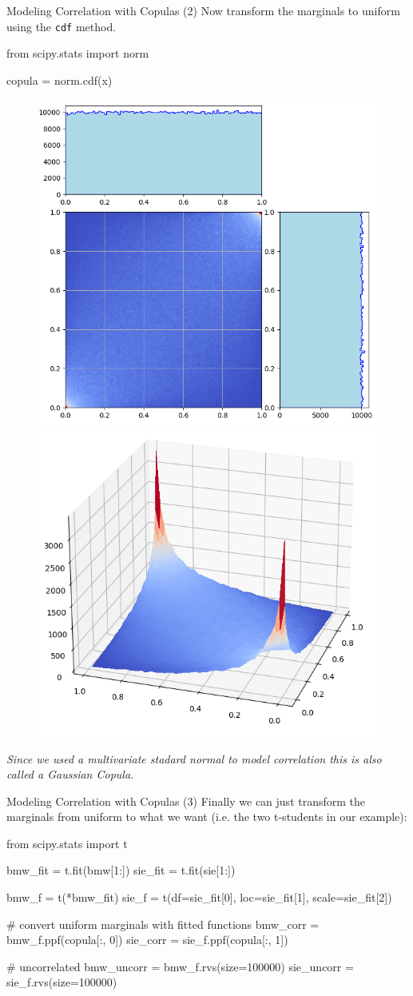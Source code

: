 \documentclass{beamer}
\begin{document}
\begin{frame}[fragile]{Modeling Correlation with Copulas (2)}
  Now transform the marginals to uniform using the \texttt{cdf} method. 
  \begin{ipython}
from scipy.stats import norm

copula = norm.cdf(x)    
\end{ipython}
  \begin{figure}[h]
    \begin{center}
      \includegraphics[width=0.4\linewidth]{copula_2d} \quad
      \includegraphics[width=0.4\linewidth]{copula_3d}
    \end{center}
  \end{figure}
  \emph{Since we used a multivariate stadard normal to model correlation this is also called a Gaussian Copula.}
\end{frame}

\begin{frame}[fragile]{Modeling Correlation with Copulas (3)}
 Finally we can just transform the marginals from uniform to what we want (i.e. the two t-students in our example):
\begin{ipython}
from scipy.stats import t

bmw_fit = t.fit(bmw[1:])
sie_fit = t.fit(sie[1:])

bmw_f = t(*bmw_fit)
sie_f = t(df=sie_fit[0], loc=sie_fit[1], scale=sie_fit[2])

# convert uniform marginals with fitted functions
bmw_corr = bmw_f.ppf(copula[:, 0])
sie_corr = sie_f.ppf(copula[:, 1])

# uncorrelated
bmw_uncorr = bmw_f.rvs(size=100000)
sie_uncorr = sie_f.rvs(size=100000)
\end{ipython}
\end{frame}
\end{document}
